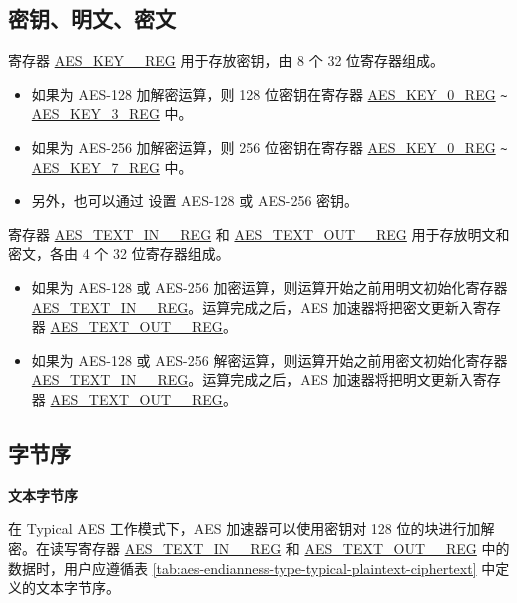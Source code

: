 \documentclass[main\_\_CN.tex]{subfiles}
\begin{document}
\subsection{密钥、明文、密文}

寄存器 \hyperref[regdesc:AESKEYNREG]{AES\_KEY\_\_REG} 用于存放密钥，由 8 个 32 位寄存器组成。

\begin{itemize}
    \item 如果为 AES-128 加解密运算，则 128 位密钥在寄存器 \hyperref[regdesc:AESKEYNREG]{AES\_KEY\_0\_REG} \verb+~+ \hyperref[regdesc:AESKEYNREG]{AES\_KEY\_3\_REG} 中。
    \item 如果为 AES-256 加解密运算，则 256 位密钥在寄存器 \hyperref[regdesc:AESKEYNREG]{AES\_KEY\_0\_REG} \verb+~+ \hyperref[regdesc:AESKEYNREG]{AES\_KEY\_7\_REG} 中。
    \item 另外，也可以通过  设置 AES-128 或 AES-256 密钥。
\end{itemize}

寄存器 \hyperref[regdesc:AESTEXTINNREG]{AES\_TEXT\_IN\_\_REG} 和 \hyperref[regdesc:AESTEXTOUTNREG]{AES\_TEXT\_OUT\_\_REG} 用于存放明文和密文，各由 4 个 32 位寄存器组成。

\begin{itemize}
    \item 如果为 AES-128 或 AES-256 加密运算，则运算开始之前用明文初始化寄存器 \hyperref[regdesc:AESTEXTINNREG]{AES\_TEXT\_IN\_\_REG}。运算完成之后，AES 加速器将把密文更新入寄存器 \hyperref[regdesc:AESTEXTOUTNREG]{AES\_TEXT\_OUT\_\_REG}。
    \item 如果为 AES-128 或 AES-256 解密运算，则运算开始之前用密文初始化寄存器 \hyperref[regdesc:AESTEXTINNREG]{AES\_TEXT\_IN\_\_REG}。运算完成之后，AES 加速器将把明文更新入寄存器 \hyperref[regdesc:AESTEXTOUTNREG]{AES\_TEXT\_OUT\_\_REG}。
\end{itemize}

\subsection{字节序}

\textbf{文本字节序}

在 Typical AES 工作模式下，AES 加速器可以使用密钥对 128 位的块进行加解密。在读写寄存器 \hyperref[regdesc:AESTEXTINNREG]{AES\_TEXT\_IN\_\_REG} 和 \hyperref[regdesc:AESTEXTINNREG]{AES\_TEXT\_OUT\_\_REG} 中的数据时，用户应遵循表 \ref{tab:aes-endianness-type-typical-plaintext-ciphertext} 中定义的文本字节序。
\end{document}
